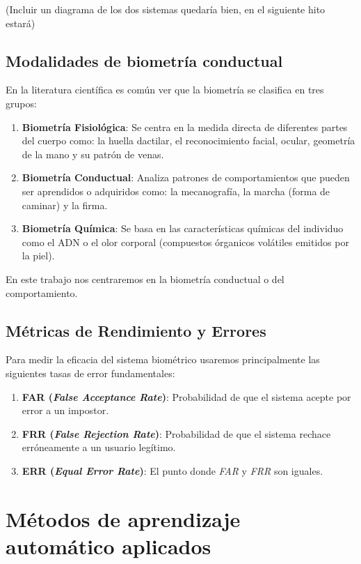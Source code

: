(Incluir un diagrama de los dos sistemas quedaría bien, en el siguiente hito estará)

\subsection*{Modalidades de biometría conductual}

En la literatura científica es común ver que la biometría se clasifica en tres grupos:

\begin{enumerate}
    \item \textbf{Biometría Fisiológica}: Se centra en la medida directa de diferentes partes del cuerpo como: 
    la huella dactilar, el reconocimiento facial, ocular, geometría de la mano y su patrón de venas.
    \item \textbf{Biometría Conductual}: Analiza patrones de comportamientos que pueden ser aprendidos o 
    adquiridos como: la mecanografía, la marcha (forma de caminar) y la firma.
    \item \textbf{Biometría Química}: Se basa en las características químicas del individuo como el ADN o 
    el olor corporal (compuestos órganicos volátiles emitidos por la piel).
\end{enumerate}

En este trabajo nos centraremos en la biometría conductual o del comportamiento.

\subsection*{Métricas de Rendimiento y Errores}

Para medir la eficacia del sistema biométrico usaremos principalmente las siguientes tasas de error fundamentales:
\begin{enumerate}
    \item \textbf{FAR (\textit{False Acceptance Rate})}: Probabilidad de que el sistema acepte por error a un impostor.
    \item \textbf{FRR (\textit{False Rejection Rate})}: Probabilidad de que el sistema rechace erróneamente a un usuario legítimo.
    \item \textbf{ERR (\textit{Equal Error Rate})}: El punto donde \textit{FAR} y \textit{FRR} son iguales.
\end{enumerate}

\section{Métodos de aprendizaje automático aplicados}

